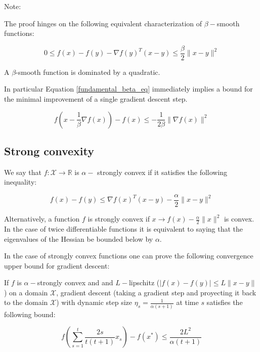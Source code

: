 Note:

The proof hinges on the following equivalent characterization of $\beta-$smooth functions:

\begin{equation}\label{fundamental_beta_eq}
0 \leq f(x) - f(y) - \nabla f(y)^T(x-y) \leq \frac{\beta}{2} \parallel x - y \parallel^2
\end{equation}

A $\beta$-smooth function is dominated by a quadratic. 

In particular Equation \ref{fundamental_beta_eq} immediately implies a bound for the minimal improvement of a single gradient descent step.

\begin{equation}
f(x- \frac{1}{\beta} \nabla f(x) ) - f(x) \leq -\frac{1}{2\beta} \parallel \nabla f(x) \parallel^2
\end{equation}










\subsection{Strong convexity}

\begin{definition}
We say that $f: \mathcal{X} \rightarrow \mathbb{R}$ is $\alpha-$ strongly convex if it satisfies the following inequality:

\begin{equation}
f(x) - f(y) \leq \nabla f(x)^T (x-y) - \frac{\alpha}{2} \parallel x -y \parallel^2
\end{equation}

\end{definition}

Alternatively, a function $f$ is strongly convex if $x \rightarrow f(x) - \frac{\alpha}{2}\parallel x \parallel^2$ is convex. In the case of twice differentiable functions it is equivalent to saying that the eigenvalues of the Hessian be bounded below by $\alpha$. 

In the case of strongly convex functions one can prove the following convergence upper bound for gradient descent:

\begin{theorem}
If $f$ is $\alpha-$strongly convex and and $L-$lipschitz ($|f(x) - f(y)| \leq L \parallel x - y\parallel $) on a domain $\mathcal{X}$, gradient descent (taking a gradient step and proyecting it back to the domain $\mathcal{X}$) with dynamic step size $\eta_s = \frac{1}{\alpha(s+1)}$ at time $s$ satisfies the following bound:

\begin{equation}
f\left(\sum_{s=1}^t \frac{2s}{t(t+1)} x_s \right) - f(x^*) \leq \frac{2L^2}{\alpha (t+1)}
\end{equation}

\end{theorem}









